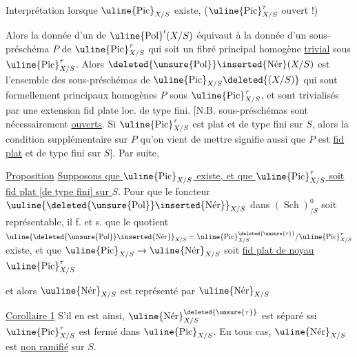 Interprétation lorsque $\uline{\operatorname{Pic}}_{X/S}$ existe, ($\uline{\operatorname{Pic}}^{\tau}_{X/S}$ ouvert !)

Alors la donnée d'un  de $\uline{\operatorname{Pol}}'(X/S)$ équivaut à la donnée d'un sous-préschéma  $P$ de $\uline{\operatorname{Pic}}^{\tau}_{X/S}$ qui soit un fibré principal homogène \uline{trivial} sous $\uline{\operatorname{Pic}}^{\tau}_{X/S}$. Alors $\deleted{\unsure{\operatorname{Pol}}}\inserted{\operatorname{N\acute{e}r}}(X/S)$ est l'ensemble des sous-préschémas  de $\uline{\operatorname{Pic}}_{X/S}\deleted{(X/S)}$ qui sont formellement principaux homogènes $P$ sous $\uline{\operatorname{Pic}}^{\tau}_{X/S}$, et sont trivialisés par une extension fid plate loc. de type fini. [N.B.  sous-préschémas sont nécessairement \uline{ouverts}. Si $\uline{\operatorname{Pic}}^{\tau}_{X/S}$ est plat et de type fini sur $S$, alors la condition supplémentaire sur $P$ qu'on vient de mettre signifie aussi que $P$ est \uline{fid plat} et de type fini sur $S$]. Par suite,


\uline{Proposition} \uline{Supposons que $\uline{\operatorname{Pic}}_{X/S}$ existe, et que $\uline{\operatorname{Pic}}^{\tau}_{X/S}$ soit fid plat [de type fini] sur $S$}. Pour que le foncteur $\uuline{\deleted{\unsure{\operatorname{Pol}}}\inserted{\operatorname{N\acute{e}r}}}_{X/S}$ dans  $(\operatorname{Sch})^0_{/S}$ soit représentable, il f. et s. que le quotient $\uline{\deleted{\unsure{\operatorname{Pol}}}\inserted{\operatorname{N\acute{e}r}}}_{X/S}=\uline{\operatorname{Pic}}^{\deleted{\unsure{\tau}}}_{X/S}/\uline{\operatorname{Pic}}^{\tau}_{X/S}$ existe, et  que $\uline{\operatorname{Pic}}_{X/S}\to\uline{\operatorname{N\acute{e}r}}_{X/S}$ soit \uline{fid plat   de noyau $\uline{\operatorname{Pic}}^{\tau}_{X/S}$}

et alors $\uuline{\operatorname{N\acute{e}r}}_{X/S}$ est représenté par $\uline{\operatorname{N\acute{e}r}}_{X/S}$

\uline{Corollaire 1} S'il en est ainsi, $\uline{\operatorname{N\acute{e}r}}^{\deleted{\unsure{\tau}}}_{X/S}$ est  séparé ssi $\uline{\operatorname{Pic}}^{\tau}_{X/S}$ est fermé dans $\uline{\operatorname{Pic}}_{X/S}$. En tous cas, $\uline{\operatorname{N\acute{e}r}}_{X/S}$ est \uline{non ramifié} sur $S$.

